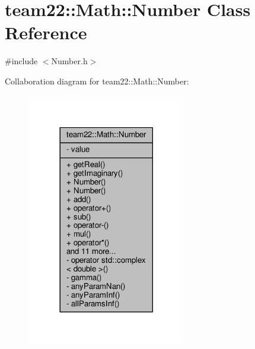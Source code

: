 \hypertarget{classteam22_1_1_math_1_1_number}{}\section{team22\+:\+:Math\+:\+:Number Class Reference}
\label{classteam22_1_1_math_1_1_number}


{\ttfamily \#include $<$Number.\+h$>$}



Collaboration diagram for team22\+:\+:Math\+:\+:Number\+:
\nopagebreak
\begin{figure}[H]
\begin{center}
\leavevmode
\includegraphics[width=197pt]{classteam22_1_1_math_1_1_number__coll__graph}
\end{center}
\end{figure}
